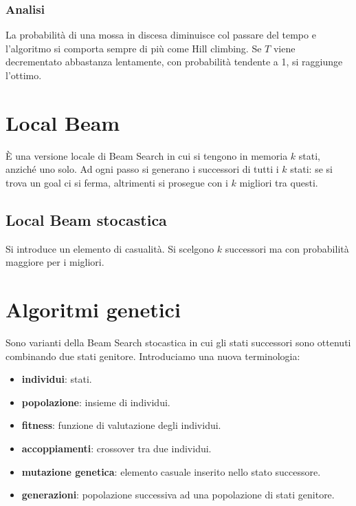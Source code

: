 \subsubsection{Analisi}
La probabilit\`a di una mossa in discesa diminuisce col passare del tempo e l'algoritmo si comporta sempre di pi\`u come Hill climbing.
Se $T$ viene decrementato abbastanza lentamente, con probabilit\`a tendente a 1, si raggiunge l'ottimo.

\section{Local Beam}
\`E una versione locale di Beam Search in cui si tengono in memoria $k$ stati, anzich\'e uno solo. Ad ogni passo si generano i successori
di tutti i $k$ stati: se si trova un goal ci si ferma, altrimenti si prosegue con i $k$ migliori tra questi.

\subsection{Local Beam stocastica}
Si introduce un elemento di casualit\`a. Si scelgono $k$ successori ma con probabilit\`a maggiore per i migliori.

\section{Algoritmi genetici}
Sono varianti della Beam Search stocastica in cui gli stati successori sono ottenuti combinando due stati genitore.
Introduciamo una nuova terminologia:
\begin{itemize}
	\item \textbf{individui}: stati.
	\item \textbf{popolazione}: insieme di individui.
	\item \textbf{fitness}: funzione di valutazione degli individui.
	\item \textbf{accoppiamenti}: crossover tra due individui.
	\item \textbf{mutazione genetica}: elemento casuale inserito nello stato successore.
	\item \textbf{generazioni}: popolazione successiva ad una popolazione di stati genitore.
\end{itemize}

